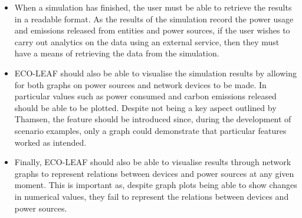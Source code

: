 \documentclass{l4proj}
\begin{document}
\begin{itemize}
    \item When a simulation has finished, the user must be able to retrieve the results in a readable format. As the results of the simulation record the power usage and emissions released from entities and power sources, if the user wishes to carry out analytics on the data using an external service, then they must have a means of retrieving the data from the simulation.
    \item ECO-LEAF should also be able to visualise the simulation results by allowing for both graphs on power sources and network devices to be made. In particular values such as power consumed and carbon emissions released should be able to be plotted. Despite not being a key aspect outlined by Thamsen, the feature should be introduced since, during the development of scenario examples, only a graph could demonstrate that particular features worked as intended.
    \item Finally, ECO-LEAF should also be able to visualise results through network graphs to represent relations between devices and power sources at any given moment. This is important as, despite graph plots being able to show changes in numerical values, they fail to represent the relations between devices and power sources.
\end{itemize}
\end{document}

